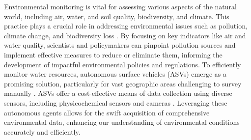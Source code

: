 \documentclass[journal]{IEEEtran}
\begin{document}

Environmental monitoring is vital for assessing various aspects of the natural world, including air, water, and soil quality, biodiversity, and climate. This practice plays a crucial role in addressing environmental issues such as pollution, climate change, and biodiversity loss \cite{alvarez-rogel_case_2020}. By focusing on key indicators like air and water quality, scientists and policymakers can pinpoint pollution sources and implement effective measures to reduce or eliminate them, informing the development of impactful environmental policies and regulations. To efficiently monitor water resources, autonomous surface vehicles (ASVs) emerge as a promising solution, particularly for vast geographic areas challenging to survey manually \cite{ASVsReef}. ASVs offer a cost-effective means of data collection using diverse sensors, including physicochemical sensors and cameras \cite{YuanReview, Hu_2021}. Leveraging these autonomous agents allows for the swift acquisition of comprehensive environmental data, enhancing our understanding of environmental conditions accurately and efficiently.

\end{document}
